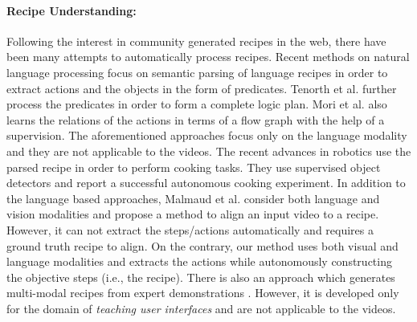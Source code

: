 \paragraph{Recipe Understanding:}
Following the interest in community generated recipes in the web, there have been many attempts to automatically process recipes. Recent methods on natural language processing \cite{cookingSemantics,logicRecipe} focus on semantic parsing of language recipes in order to extract actions and the objects in the form of predicates. Tenorth et al.\cite{logicRecipe} further process the predicates in order to form a complete logic plan. Mori et al.\cite{flowGraph} also learns the relations of the actions in terms of a flow graph with the help of a supervision. The aforementioned approaches focus only on the language modality and they are not applicable to the videos. The recent advances \cite{beetz,cookie} in robotics use the parsed recipe in order to perform cooking tasks. They use supervised object detectors and report a successful autonomous cooking experiment. In addition to the language based approaches, Malmaud et al.\cite{alignment} consider both language and vision modalities and propose a method to align an input video to a recipe. However, it can not extract the steps/actions automatically and requires a ground truth recipe to align. On the contrary, our method uses both visual and language modalities and extracts the actions while autonomously constructing the objective steps (i.e., the recipe). There is also an approach which generates multi-modal recipes from expert demonstrations \cite{photoshop}. However, it is developed only for the domain of \emph{teaching user interfaces} and are not applicable to the videos.
